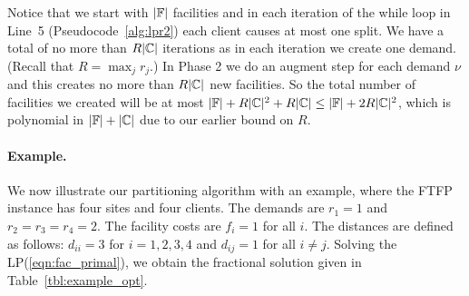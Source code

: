 \documentclass[oneside,final]{ucr}
\begin{document}
Notice that we start with $|\mathbb{F}|$ facilities and in
each iteration of the while loop in Line~5 (Pseudocode~\ref{alg:lpr2}) each client causes at most one split.
 We have a total of no more than $R|\mathbb{C}|$ iterations as in
each iteration we create one demand. (Recall that $R =
\max_jr_j$.) In Phase 2 we do an augment step for each
demand $\nu$ and this creates no more than $R|\mathbb{C}|$
new facilities.  So the total number of facilities we
created will be at most $|\mathbb{F}|+ R|\mathbb{C}|^2 +
R|\mathbb{C}| \leq |\mathbb{F}| + 2R|\mathbb{C}|^2$, which is
polynomial in $|\mathbb{F}|+|\mathbb{C}|$ due to our earlier
bound on $R$.

\paragraph{Example.}
We now illustrate our partitioning algorithm with an example, where the FTFP instance
has four sites and four clients. The demands are $r_1=1$ and $r_2=r_3=r_4=2$.
The facility costs are $f_i = 1$ for all $i$. The distances are defined as follows: 
$d_{ii} = 3$ for $i=1,2,3,4$ and $d_{ij} = 1$ for all $i\neq j$. 
Solving the LP(\ref{eqn:fac_primal}), we obtain the fractional solution given in
Table~\ref{tbl:example_opt}.
%
\end{document}
